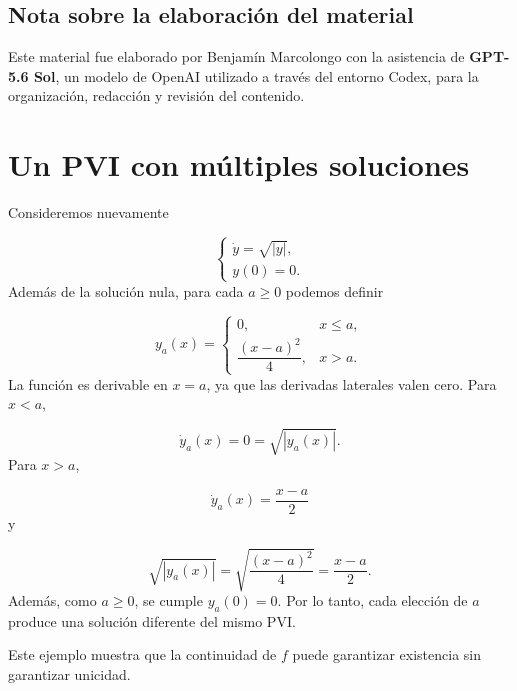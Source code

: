 \documentclass[12pt,a4paper]{article}
\begin{document}
	\subsection*{Nota sobre la elaboración del material}

	Este material fue elaborado por Benjamín Marcolongo con la asistencia de \textbf{GPT-5.6 Sol}, un modelo de OpenAI utilizado a través del entorno Codex, para la organización, redacción y revisión del contenido.

	\clearpage
	\appendix

	\section{Un PVI con múltiples soluciones}

	Consideremos nuevamente

	\[
	\begin{cases}
		\dot{y}=\sqrt{|y|},\\
		y(0)=0.
	\end{cases}
	\]
Además de la solución nula, para cada \(a\geq 0\) podemos definir

	\[
	y_a(x)=
	\begin{cases}
		0, & x\leq a,\\[0.2cm]
		\dfrac{(x-a)^2}{4}, & x>a.
	\end{cases}
	\]
La función es derivable en \(x=a\), ya que las derivadas laterales valen cero. Para \(x<a\),

	\[
	\dot{y}_a(x)=0=\sqrt{|y_a(x)|}.
	\]
Para \(x>a\),

	\[
	\dot{y}_a(x)=\frac{x-a}{2}
	\]
y

	\[
	\sqrt{|y_a(x)|}
	=
	\sqrt{\frac{(x-a)^2}{4}}
	=
	\frac{x-a}{2}.
	\]
Además, como \(a\geq 0\), se cumple \(y_a(0)=0\). Por lo tanto, cada elección de \(a\) produce una solución diferente del mismo PVI.

	Este ejemplo muestra que la continuidad de \(f\) puede garantizar existencia sin garantizar unicidad.
\end{document}
